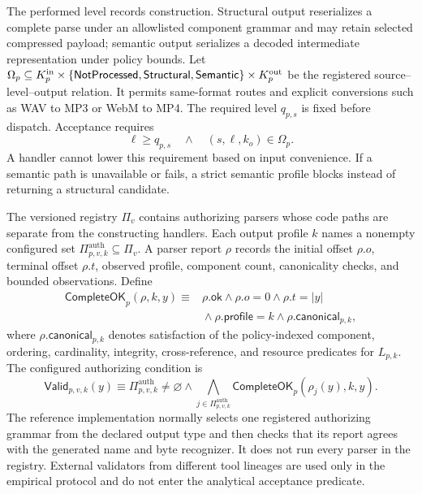 The performed level records construction. Structural output reserializes a
complete parse under an allowlisted component grammar and may retain selected
compressed payload; semantic output serializes a decoded intermediate
representation under policy bounds. Let
\(\Omega_p\subseteq
K^{\mathrm{in}}_p\times
\{\mathsf{NotProcessed},\mathsf{Structural},\mathsf{Semantic}\}\times K^{\mathrm{out}}_p\)
be the registered source--level--output relation. It permits same-format routes
and explicit conversions such as WAV to MP3 or WebM to MP4. The required
level \(q_{p,s}\) is fixed before dispatch. Acceptance requires
\begin{equation}
  \ell\geq q_{p,s}
  \quad\land\quad
  (s,\ell,k_o)\in\Omega_p.
  \label{eq:level-satisfaction}
\end{equation}
A handler cannot lower this requirement based on input convenience. If a
semantic path is unavailable or fails, a strict semantic profile blocks instead
of returning a structural candidate.

The versioned registry \(\Pi_v\) contains authorizing parsers whose code paths
are separate from the constructing handlers. Each output profile \(k\) names a
nonempty configured set
\(\Pi^{\mathrm{auth}}_{p,v,k}\subseteq\Pi_v\). A parser report \(\rho\) records
the initial offset \(\rho.o\), terminal offset \(\rho.t\), observed profile,
component count, canonicality checks, and bounded observations. Define
\begin{equation}
\begin{split}
  \mathsf{CompleteOK}_{p}(\rho,k,y)\equiv{}&
  \rho.\mathsf{ok}\land \rho.o=0\land\rho.t=|y|\\
  &{}\land \rho.\mathsf{profile}=k
  \land \rho.\mathsf{canonical}_{p,k},
\end{split}
\label{eq:complete-output-report}
\end{equation}
where \(\rho.\mathsf{canonical}_{p,k}\) denotes satisfaction of the
policy-indexed component, ordering, cardinality, integrity, cross-reference,
and resource predicates for \(L_{p,k}\). The configured authorizing condition is
\begin{equation}
  \mathsf{Valid}_{p,v,k}(y)\equiv
  \Pi^{\mathrm{auth}}_{p,v,k}\neq\varnothing
  \land
  \bigwedge_{j\in\Pi^{\mathrm{auth}}_{p,v,k}}
  \mathsf{CompleteOK}_{p}(\rho_j(y),k,y).
  \label{eq:authorizing-validation}
\end{equation}
The reference implementation normally selects one registered authorizing
grammar from the declared output type and then checks that its report agrees
with the generated name and byte recognizer. It does not run every parser in
the registry. External validators from different tool lineages are used only
in the empirical protocol and do not enter the analytical acceptance predicate.


